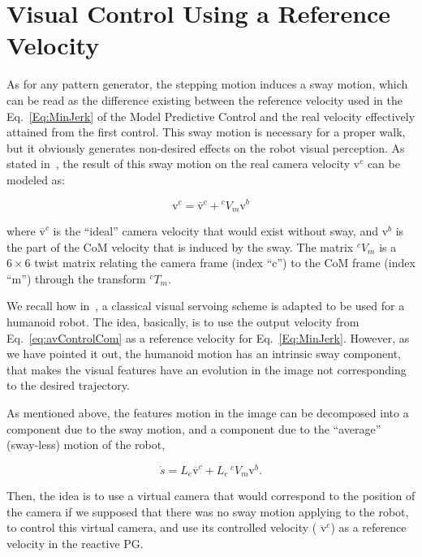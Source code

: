 \section{Visual Control Using a Reference Velocity}
\label{sec:vsclaire}


As for any pattern generator, the stepping motion induces a sway motion, which can be read as the difference existing between the reference velocity used in the Eq.~\ref{Eq:MinJerk} of the Model Predictive Control and the real velocity effectively attained from the first control. This sway motion is necessary for a proper walk, but it obviously generates non-desired effects on the robot visual perception. As stated in~\citep{DuneIROS2010}, the result of this sway motion on the real camera velocity $\text{v}^c$ can be modeled as:

\begin{equation}
\text{{v}}^c =\overline{\text{{v}}}^c+{^{c}  V_{m}} \text{{v}}^b
\label{eq:sway}
\end{equation}

where $\overline{\text{{v}}}^c$ is the ``ideal'' camera velocity that would exist without sway, and $\text{{v}}^b$ is the part of the CoM velocity that is induced by the sway. The matrix ${^c  V_{m}}$ is a $6\times6$ twist matrix relating the camera frame (index ``c'') to the CoM frame (index ``m'') through the transform ${^cT_{m}}$.

We recall how in~\citep{DuneIROS2010}, a classical visual servoing scheme is adapted to be used for a humanoid robot. The idea, basically, is to use the output velocity from Eq.~\ref{eq:avControlCom} as a reference velocity for Eq.~\ref{Eq:MinJerk}. However, as we have pointed it out, the humanoid motion has an intrinsic sway component, that makes the visual features have an evolution in the image not corresponding to the desired trajectory. 

As mentioned above, the features motion in the image can be decomposed into a component due to the sway motion, and a component due to the ``average'' (sway-less) motion of the robot,

\begin{equation}
\label{Eq:FeaturesSway}
\dot{ s}={ L_e} \overline{\text{v}}^c+ { L_e} \, ^c  V_{m}{\text{v}^{b}}.
\end{equation}

Then, the idea is to use a virtual camera that would correspond to the position of the camera if we supposed that there was no sway motion applying to the robot, to control this virtual camera, and use its controlled velocity ($\overline{\text{ v}}^c$) as a reference velocity in the reactive PG.
 
